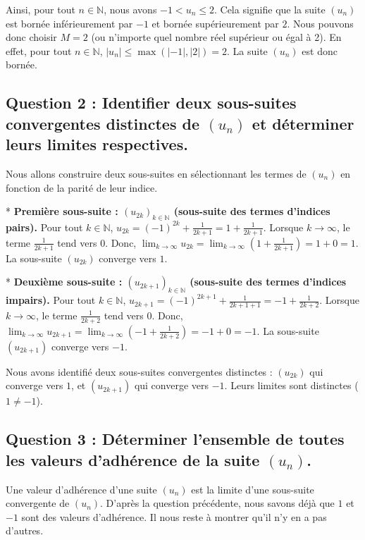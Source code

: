 \documentclass{report}
\begin{document}
Ainsi, pour tout $n \in \mathbb{N}$, nous avons $-1 < u_n \le 2$.
Cela signifie que la suite $(u_n)$ est bornée inférieurement par $-1$ et bornée supérieurement par $2$.
Nous pouvons donc choisir $M=2$ (ou n'importe quel nombre réel supérieur ou égal à 2).
En effet, pour tout $n \in \mathbb{N}$, $|u_n| \le \max(|-1|, |2|) = 2$.
La suite $(u_n)$ est donc bornée.

\subsection*{Question 2 : Identifier deux sous-suites convergentes distinctes de $(u_n)$ et déterminer leurs limites respectives.}

Nous allons construire deux sous-suites en sélectionnant les termes de $(u_n)$ en fonction de la parité de leur indice.

*   \textbf{Première sous-suite : $(u_{2k})_{k \in \mathbb{N}}$ (sous-suite des termes d'indices pairs).}
    Pour tout $k \in \mathbb{N}$, $u_{2k} = (-1)^{2k} + \frac{1}{2k+1} = 1 + \frac{1}{2k+1}$.
    Lorsque $k \to \infty$, le terme $\frac{1}{2k+1}$ tend vers $0$.
    Donc, $\lim_{k \to \infty} u_{2k} = \lim_{k \to \infty} \left(1 + \frac{1}{2k+1}\right) = 1 + 0 = 1$.
    La sous-suite $(u_{2k})$ converge vers $1$.

*   \textbf{Deuxième sous-suite : $(u_{2k+1})_{k \in \mathbb{N}}$ (sous-suite des termes d'indices impairs).}
    Pour tout $k \in \mathbb{N}$, $u_{2k+1} = (-1)^{2k+1} + \frac{1}{2k+1+1} = -1 + \frac{1}{2k+2}$.
    Lorsque $k \to \infty$, le terme $\frac{1}{2k+2}$ tend vers $0$.
    Donc, $\lim_{k \to \infty} u_{2k+1} = \lim_{k \to \infty} \left(-1 + \frac{1}{2k+2}\right) = -1 + 0 = -1$.
    La sous-suite $(u_{2k+1})$ converge vers $-1$.

Nous avons identifié deux sous-suites convergentes distinctes : $(u_{2k})$ qui converge vers $1$, et $(u_{2k+1})$ qui converge vers $-1$. Leurs limites sont distinctes ($1 \ne -1$).

\subsection*{Question 3 : Déterminer l'ensemble de toutes les valeurs d'adhérence de la suite $(u_n)$.}

Une valeur d'adhérence d'une suite $(u_n)$ est la limite d'une sous-suite convergente de $(u_n)$. D'après la question précédente, nous savons déjà que $1$ et $-1$ sont des valeurs d'adhérence. Il nous reste à montrer qu'il n'y en a pas d'autres.
\end{document}
